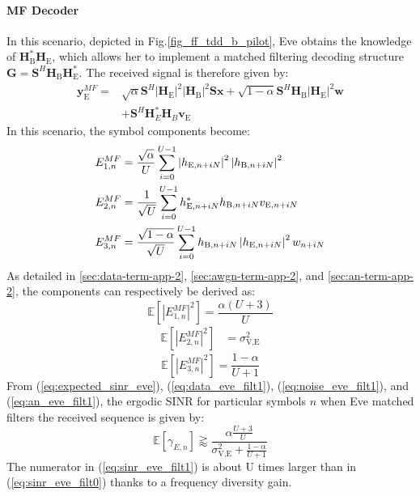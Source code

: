 \documentclass[journal,comsoc]{IEEEtran}
\newcommand{\module}[1]{\left|#1\right|}
\newcommand{\EX}[1]{\mathbb{E} \left[#1\right]}%
\newcommand{\HE}{\textbf{H}_{\text{E}}}
\newcommand{\HB}{\textbf{H}_{\text{B}}}
\newcommand{\ve}{\textbf{v}_{\text{E}}}
\newcommand{\spread}{\textbf{S}}
\newcommand{\w}{\textbf{w}}
\begin{document}
\paragraph{MF Decoder}
In this scenario, depicted in Fig.\ref{fig_ff_tdd_b_pilot}, Eve obtains the knowledge of $\HB^*\HE$, which allows her to implement a matched filtering decoding structure $\textbf{G} = \spread^H \HB\HE^*$. The received signal is therefore given by:
\begin{equation}
\begin{split}
\textbf{y}_{\text{E}}^{MF} =& \sqrt{\alpha} \spread^H \module{\HE}^2 \module{\HB}^2 \spread\textbf{x} +  \sqrt{1-\alpha} \spread^H \HB\module{\HE}^2 \w\\
&+  \spread^H  \textbf{H}^*_E \textbf{H}_B \ve
\end{split}
\label{eq:rx_eve_filt1}
\end{equation}
In this scenario, the symbol components become:
\begin{equation}
\begin{split}
E_{1,n}^{MF} &= \frac{\sqrt{\alpha}}{U}\sum_{i=0}^{U-1}  \left|h_{\text{E}, n + iN}\right|^2 \left|h_{\text{B}, n + iN}\right|^2 \\
E_{2,n}^{MF} &= \frac{1}{\sqrt{U}}\sum_{i=0}^{U-1} h^*_{\text{E}, n + iN} h_{\text{B}, n + iN} v_{\text{E}, n + iN}\\
E_{3,n}^{MF} &=\frac{ \sqrt{1-\alpha}  }{\sqrt{U}}\sum_{i=0}^{U-1}    h_{\text{\text{B}}, n + iN} \left|h_{\text{E}, n + iN}\right|^2w_{n + iN}
\end{split}
\end{equation}
As detailed in  \ref{sec:data-term-app-2},  \ref{sec:awgn-term-app-2}, and \ref{sec:an-term-app-2}, the components can respectively be derived as:
\begin{equation}
\EX{|E_{1,n}^{MF}|^2} =  \frac{\alpha (U+3)}{U}
\label{eq:data_eve_filt1}
\end{equation}
\begin{equation}
	\begin{split}
	\EX{|E_{2,n}^{MF}|^2} &= \sigma^2_{\text{V,E}}
	\end{split}
	\label{eq:noise_eve_filt1}
\end{equation}
\begin{equation}
	\EX{|E_{3,n}^{MF}|^2} = \frac{1-\alpha}{U+1}
	\label{eq:an_eve_filt1}
\end{equation}
From (\ref{eq:expected_sinr_eve}), (\ref{eq:data_eve_filt1}), (\ref{eq:noise_eve_filt1}), and (\ref{eq:an_eve_filt1}),  the ergodic SINR for particular symbols $n$ when Eve matched filters the received sequence is given by:
\begin{equation}
\EX{\gamma_{E,n}} \gtrapprox \frac{\alpha \frac{U+3}{U}}{\sigma^2_{\text{V,E}} + \frac{1-\alpha}{U+1}}
\label{eq:sinr_eve_filt1}
\end{equation}
The numerator in (\ref{eq:sinr_eve_filt1}) is about U times larger than in (\ref{eq:sinr_eve_filt0}) thanks to a frequency diversity gain.
\end{document}
